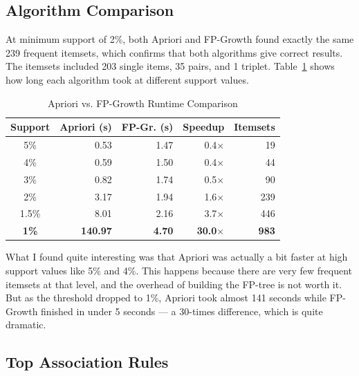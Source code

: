 \documentclass[conference]{IEEEtran}
\begin{document}
\subsection{Algorithm Comparison}

At minimum support of 2\%, both Apriori and FP-Growth found exactly the same 239 frequent itemsets, which confirms that both algorithms give correct results. The itemsets included 203 single items, 35 pairs, and 1 triplet. Table~\ref{tab:algo} shows how long each algorithm took at different support values.

\begin{table}[htbp]
    \caption{Apriori vs. FP-Growth Runtime Comparison}
    \begin{center}
        \begin{tabular}{|c|r|r|r|r|}
            \hline
            \textbf{Support} & \textbf{Apriori (s)} & \textbf{FP-Gr. (s)} & \textbf{Speedup} & \textbf{Itemsets} \\
            \hline
            5\% & 0.53 & 1.47 & 0.4$\times$ & 19 \\
            \hline
            4\% & 0.59 & 1.50 & 0.4$\times$ & 44 \\
            \hline
            3\% & 0.82 & 1.74 & 0.5$\times$ & 90 \\
            \hline
            2\% & 3.17 & 1.94 & 1.6$\times$ & 239 \\
            \hline
            1.5\% & 8.01 & 2.16 & 3.7$\times$ & 446 \\
            \hline
            \textbf{1\%} & \textbf{140.97} & \textbf{4.70} & \textbf{30.0$\times$} & \textbf{983} \\
            \hline
        \end{tabular}
        \label{tab:algo}
    \end{center}
\end{table}

What I found quite interesting was that Apriori was actually a bit faster at high support values like 5\% and 4\%. This happens because there are very few frequent itemsets at that level, and the overhead of building the FP-tree is not worth it. But as the threshold dropped to 1\%, Apriori took almost 141 seconds while FP-Growth finished in under 5 seconds — a 30-times difference, which is quite dramatic.

\subsection{Top Association Rules}
\end{document}

